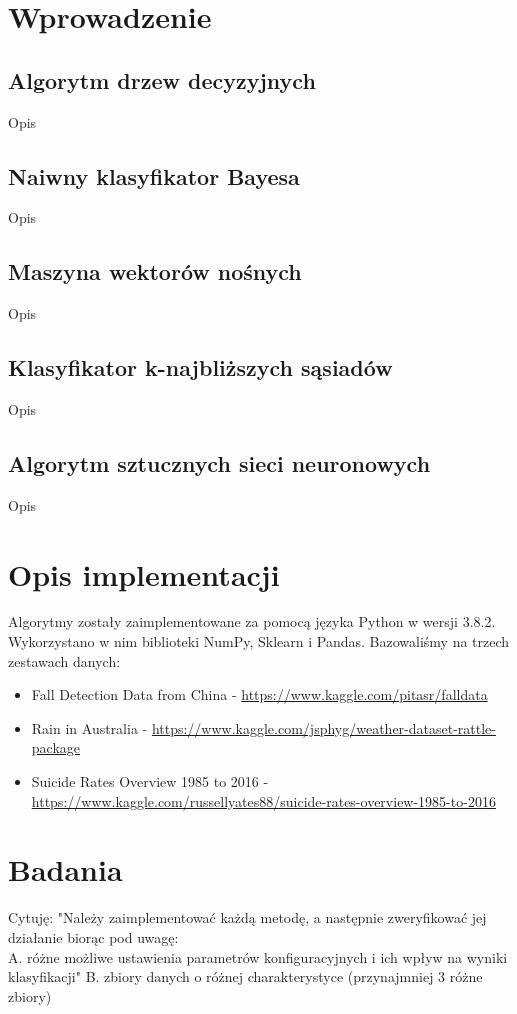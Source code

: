 \documentclass[a4paper,11pt]{article}
\begin{document}
\section{Wprowadzenie}
\subsection{Algorytm drzew decyzyjnych}
Opis

\subsection{Naiwny klasyfikator Bayesa}
Opis

\subsection{Maszyna wektorów nośnych}
Opis

\subsection{Klasyfikator k-najbliższych sąsiadów}
Opis

\subsection{Algorytm sztucznych sieci neuronowych}
Opis

\section{Opis implementacji}
Algorytmy zostały zaimplementowane za pomocą języka Python w wersji 3.8.2.
Wykorzystano w nim biblioteki NumPy, Sklearn i Pandas. Bazowaliśmy na trzech zestawach danych: 
\begin{itemize}
    \item{Fall Detection Data from China - \url{https://www.kaggle.com/pitasr/falldata}}
    \item{Rain in Australia - \url{https://www.kaggle.com/jsphyg/weather-dataset-rattle-package}}
    \item{Suicide Rates Overview 1985 to 2016 - \url{https://www.kaggle.com/russellyates88/suicide-rates-overview-1985-to-2016}}
\end{itemize}

\section{Badania}
\color{red}
Cytuję: "Należy zaimplementować każdą metodę, a następnie zweryfikować jej działanie biorąc pod uwagę:\\
A. różne możliwe ustawienia parametrów konfiguracyjnych i ich wpływ na wyniki klasyfikacji"
B. zbiory danych o różnej charakterystyce (przynajmniej 3 różne zbiory)
\color{black}
\end{document}
